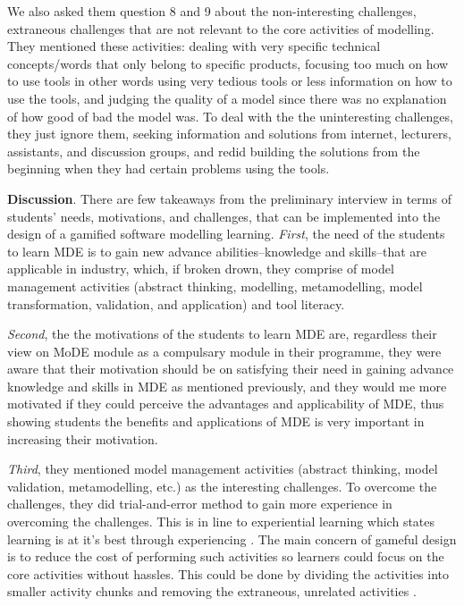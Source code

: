 \documentclass[12pt, a4paper]{report}
\begin{document}
We also asked them question 8 and 9 about the non-interesting challenges, extraneous challenges that are not relevant to the core activities of modelling.  They mentioned these activities: dealing with very specific technical concepts/words that only belong to specific products, focusing too much on how to use tools in other words using very tedious tools or less information on how to use the tools, and judging the quality of a model since there was no explanation of how good of bad the model was. To deal with the the uninteresting challenges, they just ignore them, seeking information and solutions from internet, lecturers, assistants, and discussion groups, and redid building the solutions from the beginning when they had certain problems using the tools.

\textbf{Discussion}. There are few takeaways from the preliminary interview in terms of students' needs, motivations, and challenges, that can be implemented into the design of a gamified software modelling learning. \textit{First}, the need of the students to learn MDE is to gain new advance abilities--knowledge and skills--that are applicable in industry, which, if broken drown, they comprise of model management activities (abstract thinking, modelling, metamodelling, model transformation, validation, and application) and tool literacy. 

\textit{Second}, the the motivations of the students to learn MDE are, regardless their view on MoDE module as a compulsary module in their programme, they were aware that their motivation should be on satisfying their need in gaining advance knowledge and skills in MDE as mentioned previously, and they would me more motivated if they could perceive the advantages and applicability of MDE, thus showing students the benefits and applications of MDE is very important in increasing their motivation.

\textit{Third}, they mentioned model management activities (abstract thinking, model validation, metamodelling, etc.) as the interesting challenges. To overcome the challenges, they did trial-and-error method to gain more experience in overcoming the challenges. This is in line to experiential learning which states learning is at it's best through experiencing \cite{kolb2014experiential}. The main concern of gameful design is to reduce the cost of  performing such activities so learners could focus on the core activities without hassles. This could be done by dividing the activities into smaller activity chunks and removing the extraneous, unrelated activities \cite{deterding2015lens}. 
\end{document}
